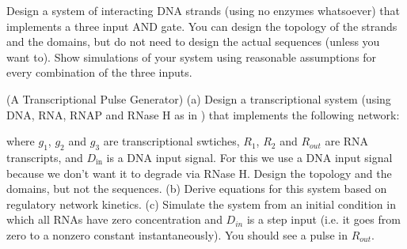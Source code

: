 \begin{exercise}
  Design a system of interacting DNA strands (using no enzymes
  whatsoever) that implements a three input AND gate. You can design
  the topology of the strands and the domains, but do not need to
  design the actual sequences (unless you want to). Show simulations
  of your system using reasonable assumptions for every combination of
  the three inputs.
\end{exercise}

\begin{exercise}
  (A Transcriptional Pulse Generator) (a) Design a transcriptional system
  (using DNA, RNA, RNAP and RNase H as in \cite{kim-winfree-bistable})
  that implements the following network: 
%
\begin{center}
\end{center}
%
where $g_1$, $g_2$ and $g_3$ are transcriptional swtiches, $R_1$,
$R_2$ and $R_\mathit{out}$ are RNA transcripts, and $D_\mathrm{in}$ is
a DNA input signal. For this we use a DNA input signal because we
don't want it to degrade via RNase H. Design the topology and the
domains, but not the sequences. (b) Derive equations for this system
based on regulatory network kinetics. (c) Simulate the system from an
initial condition in which all RNAs have zero concentration and
$D_\mathit{in}$ is a step input (i.e. it goes from zero to a nonzero
constant instantaneously). You should see a pulse in $R_\mathit{out}$.
\end{exercise}